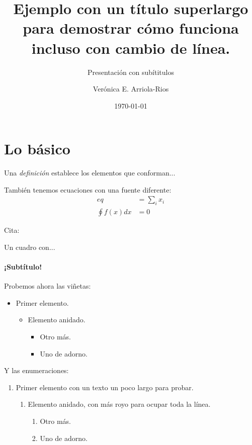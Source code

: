 \documentclass[aspectratio=169,usenames,dvipsnames,svgnames,table]{beamer}
\title{Ejemplo con un título superlargo para demostrar cómo funciona incluso con cambio de línea.}
\subtitle{Presentación con subítitulos}
\author[Ver\'onica E. Arriola-Rios]{Verónica E. Arriola-Rios}
\institute{Facultad de Ciencias, UNAM}
\date{\today}
\begin{document}
\frame{\titlepage}

\section{Lo básico}

\begin{frame}
\begin{definition}[Definición]
 Una \emph{definición} establece los elementos que conforman...
\end{definition}

También tenemos ecuaciones con una fuente diferente:
\begin{align}
 eq &= \sum_{i} x_i \\
 \oint f(x) dx &= 0
\end{align}

Cita: \cite{Viso2012}

\end{frame}



\begin{frame}{Un cuadro con...}
\framesubtitle{¡Subtítulo!}
Probemos ahora las viñetas:
\begin{itemize}
 \item Primer elemento.
 \begin{itemize}
  \item Elemento anidado.
  \begin{itemize}
   \item Otro más.
   \item Uno de adorno.
  \end{itemize}
 \end{itemize}
\end{itemize}

Y las enumeraciones:
\begin{enumerate}
 \item Primer elemento con un texto un poco largo para probar.
 \begin{enumerate}
  \item Elemento anidado, con más royo para ocupar toda la línea.
  \begin{enumerate}
   \item Otro más.
   \item Uno de adorno.
  \end{enumerate}
 \end{enumerate}
\end{enumerate}

\end{frame}
\end{document}
